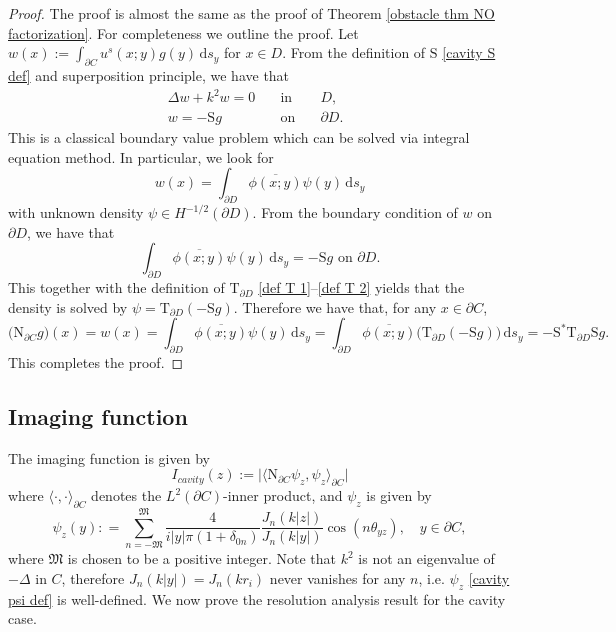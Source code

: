 \documentclass[final]{siamltex}
\newcommand{\ind}{\,\mbox{d}}
\begin{document}
\begin{proof}
The proof is almost the same as the proof of Theorem \ref{obstacle thm NO factorization}. For completeness we outline the proof.
Let $w(x):=\int_{\partial C} u^s(x;y) g(y) \ind s_y$ for $x \in D$. From the definition of   $\mathrm{S}$ \eqref{cavity S def} and superposition principle, we have that
\begin{eqnarray*}
\Delta w + k^2 w = 0 \quad &\mbox{in}& \quad D, \quad \\
w = - \mathrm{S} g \quad &\mbox{on}& \quad \partial D   .
\end{eqnarray*}
This is a classical boundary value problem which can be solved via integral equation method. In particular, we look for
$$
w(x) = \int_{\partial D} \overline{\phi(x;y)} \psi(y) \ind s_y
$$
with unknown density $\psi \in H^{-1/2}(\partial D)$. From the boundary condition of $w$ on $\partial D$, we have that
$$
\int_{\partial D} \overline{\phi(x;y)} \psi(y) \ind s_y = - \mathrm{S} g \mbox{ on } \partial D.
$$
This together with the definition of $\mathrm{T}_{\partial D}$ \eqref{def T 1}--\eqref{def T 2} yields that the density is solved by $\psi=\mathrm{T}_{\partial D} (- \mathrm{S} g)$. Therefore we have that, for any $x\in \partial C$,
$$
\big( \mathrm{N}_{\partial C} g \big) (x) = w(x)= \int_{\partial D} \overline{\phi(x;y)} \psi(y) \ind s_y = \int_{\partial D} \overline{\phi(x;y)} \big(\mathrm{T}_{\partial D} (- \mathrm{S} g) \big) \ind s_y = -  \mathrm{S}^* \mathrm{T}_{\partial D} \mathrm{S} g.
$$
This completes the proof.
\end{proof}
\subsection{Imaging function}
The imaging function is given by
\begin{equation}\label{imaging function cavity}
I_{cavity}(z):=\big| \langle   \mathrm{N}_{\partial C} \psi_z, \psi_z \rangle_{\partial C} \big|
\end{equation}
where $\langle \cdot, \cdot \rangle_{\partial C}$ denotes the $L^2(\partial C)$-inner product, and $\psi_z$ is given by
\begin{equation} \label{cavity psi def}
\psi_z(y): = \sum_{n=-\mathfrak{M}}^{\mathfrak{M}} \frac{4}{i|y|\pi(1+\delta_{0n})}    \frac{J_n(k|z|)}{J_n(k|y|)}\cos(n\theta_{yz}), \quad y\in \partial C,
\end{equation}
where {\footnotesize $\mathfrak{M}$} is chosen to be a positive integer.  Note that  $k^2$ is not an eigenvalue of $-\Delta$ in $C$, therefore $J_n(k|y|)=J_n(kr_i)$ never vanishes for any $n$, i.e.  $\psi_z$ \eqref{cavity psi def} is well-defined.   We now prove the resolution analysis result for the cavity case.
\end{document}
